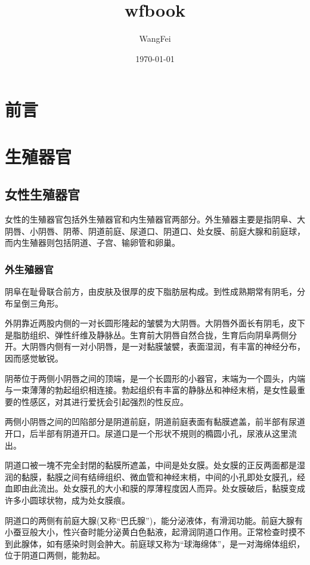 \documentclass[12pt,UTF8]{ctexbook}
\title{\heiti\zihao{0} wfbook}
\author{WangFei}
\date{\today}
\begin{document}
\maketitle
\tableofcontents

\frontmatter

\chapter{前言}



\mainmatter

\chapter{生殖器官}

\section{女性生殖器官}

女性的生殖器官包括外生殖器官和内生殖器官两部分。外生殖器主要是指阴阜、大阴唇、小阴唇、阴蒂、阴道前庭、尿道口、阴道口、处女膜、前庭大腺和前庭球，而内生殖器则包括阴道、子宫、输卵管和卵巢。

\subsection{外生殖器官}

阴阜在耻骨联合前方，由皮肤及很厚的皮下脂肪层构成。到性成熟期常有阴毛，分布呈倒三角形。

外阴靠近两股内侧的一对长圆形隆起的皱襞为大阴唇。大阴唇外面长有阴毛，皮下是脂肪组织、弹性纤维及静脉丛。生育前大阴唇自然合拢，生育后向阴阜两侧分开。大阴唇内侧有一对小阴唇，是一对黏膜皱襞，表面湿润，有丰富的神经分布，因而感觉敏锐。

阴蒂位于两侧小阴唇之间的顶端，是一个长圆形的小器官，末端为一个圆头，内端与一束薄薄的勃起组织相连接。勃起组织有丰富的静脉丛和神经末梢，是女性最重要的性感区，对其进行爱抚会引起强烈的性反应。

两侧小阴唇之间的凹陷部分是阴道前庭，阴道前庭表面有黏膜遮盖，前半部有尿道开口，后半部有阴道开口。尿道口是一个形状不規则的橢圆小孔，尿液从这里流出。

阴道口被一塊不完全封閉的黏膜所遮盖，中间是处女膜。处女膜的正反两面都是湿润的黏膜，黏膜之间有结缔组织、微血管和神经末梢，中间的小孔即处女膜孔，经血即由此流出。处女膜孔的大小和膜的厚薄程度因人而异。处女膜破后，黏膜变成许多小圆球状物，成为处女膜痕。

阴道口的两侧有前庭大腺(又称“巴氏腺”)，能分泌液体，有滑润功能。前庭大腺有小蚕豆般大小，性兴奋时能分泌黄白色黏液，起滑润阴道口作用。正常检查时摸不到此腺体，如有感染时则会肿大。前庭球又称为“球海绵体”，是一对海绵体组织，位于阴道口两侧，能勃起。
\end{document}
